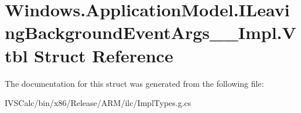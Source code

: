 \hypertarget{struct_windows_1_1_application_model_1_1_i_leaving_background_event_args_____impl_1_1_vtbl}{}\section{Windows.\+Application\+Model.\+I\+Leaving\+Background\+Event\+Args\+\_\+\+\_\+\+Impl.\+Vtbl Struct Reference}
\label{struct_windows_1_1_application_model_1_1_i_leaving_background_event_args_____impl_1_1_vtbl}


The documentation for this struct was generated from the following file\+:\begin{DoxyCompactItemize}
\item 
I\+V\+S\+Calc/bin/x86/\+Release/\+A\+R\+M/ilc/Impl\+Types.\+g.\+cs\end{DoxyCompactItemize}
